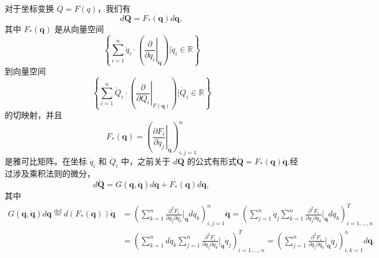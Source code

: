 对于坐标变换 \( Q = F(q) \)，我们有
\[
d\mathbf{Q} = F_{*}(\mathbf{q}) d\mathbf{q},~
\]
其中 \( F_{*}(\mathbf{q}) \) 是从向量空间
\[
\left\{\sum_{i=1}^{n} \dot{q}_{i} \cdot \left(\left.\frac{\partial}{\partial q_{i}}\right|_{\mathbf{q}}\right) \bigg| \dot{q}_{i} \in \mathbb{R} \right\}~
\]
到向量空间
\[
\left\{\sum_{i=1}^{n} \dot{Q}_{i} \cdot \left(\left.\frac{\partial}{\partial Q_{i}}\right|_{F(\mathbf{q})}\right) \bigg| \dot{Q}_{i} \in \mathbb{R} \right\}~
\]
的切映射，并且
\[
F_{*}(\mathbf{q}) = \left(\left.\frac{\partial F_{i}}{\partial q_{j}}\right|_{\mathbf{q}}\right)_{i,j=1}^{n}~
\]
是雅可比矩阵。在坐标 \( \dot{q}_{i} \) 和 \( \dot{Q}_{i} \) 中，之前关于 \( d\mathbf{Q} \) 的公式有形式\(\dot{\mathbf{Q}} = F_{*}(\mathbf{q}) \dot{\mathbf{q}}\).经过涉及乘积法则的微分，
\[{\displaystyle d{\dot {\mathbf {Q}}} = G(\mathbf {q}, {\dot {\mathbf {q}}}) d\mathbf {q} + F_{*}(\mathbf {q}) d{\dot {\mathbf {q}}},} ~\]
其中
\begin{equation}
\begin{aligned}
G(\mathbf {q}, {\dot {\mathbf {q}}}) d\mathbf {q} \stackrel{\text{def}}{=} d(F_{*}(\mathbf {q})) {\dot {\mathbf {q}}} &= \left(\sum_{k=1}^{n} \frac{\partial^2 F_{i}}{\partial q_{j} \partial q_{k}} \bigg|_{\mathbf {q}} dq_{k}\right)_{i,j=1}^{n} {\dot {\mathbf {q}}} = \left(\sum_{j=1}^{n} \dot{q}_{j} \sum_{k=1}^{n} \frac{\partial^2 F_{i}}{\partial q_{j} \partial q_{k}} \bigg|_{\mathbf {q}} dq_{k}\right)_{i=1,\ldots,n}^{T}\\
&= \left(\sum_{k=1}^{n} dq_{k} \sum_{j=1}^{n} \frac{\partial^2 F_{i}}{\partial q_{j} \partial q_{k}} \bigg|_{\mathbf {q}} {\dot {q}}_{j}\right)_{i=1,\ldots,n}^{T} = \left(\sum_{j=1}^{n} \frac{\partial^2 F_{i}}{\partial q_{j} \partial q_{k}} \bigg|_{\mathbf {q}} {\dot {q}}_{j}\right)_{i,k=1}^{n} d\mathbf {q}.
\end{aligned}~
\end{equation}

